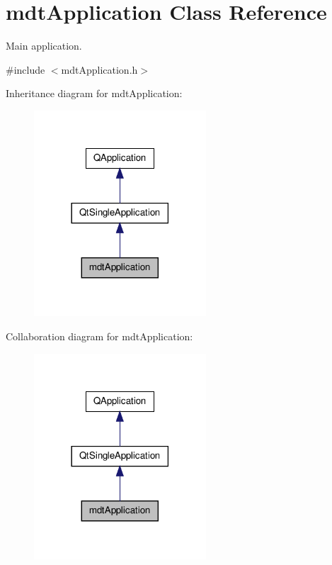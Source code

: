 \hypertarget{classmdt_application}{\section{mdt\-Application Class Reference}
\label{classmdt_application}
}


Main application.  




{\ttfamily \#include $<$mdt\-Application.\-h$>$}



Inheritance diagram for mdt\-Application\-:
\nopagebreak
\begin{figure}[H]
\begin{center}
\leavevmode
\includegraphics[width=182pt]{classmdt_application__inherit__graph}
\end{center}
\end{figure}


Collaboration diagram for mdt\-Application\-:
\nopagebreak
\begin{figure}[H]
\begin{center}
\leavevmode
\includegraphics[width=182pt]{classmdt_application__coll__graph}
\end{center}
\end{figure}
